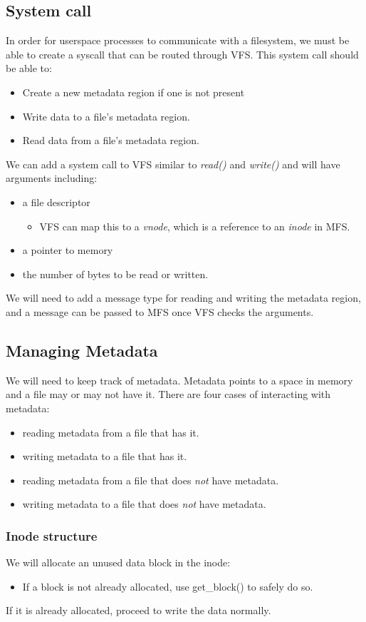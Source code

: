 \documentclass[paper=a4, fontsize=11pt]{scrartcl}
\numberwithin{equation}{section} %
\numberwithin{figure}{section} %
\numberwithin{table}{section} %
\begin{document}
	\subsection{System call}
	In order for userspace processes to communicate with a filesystem, we must be able to create a syscall that can be routed through VFS. This system call should be able to:
		\begin{itemize}
			\item Create a new metadata region if one is not present
			\item Write data to a file's metadata region.
			\item Read data from a file's metadata region. 
		\end{itemize}
	We can add a system call to VFS similar to {\it read()} and {\it write()} and will have arguments 		including:
		\begin{itemize}
			\item a file descriptor
			\begin{itemize}
				\item VFS can map this to a {\it vnode}, which is a reference to an {\it inode} in MFS.
			\end {itemize}
			\item a pointer to memory
			\item the number of bytes to be read or written.
		\end{itemize}
	We will need to add a message type for reading and writing the metadata region, and a message can be passed to MFS once VFS checks the arguments.


	\subsection{Managing Metadata}
	We will need to keep track of metadata. Metadata points to a space in memory and a file may or may not have it. There are four cases of interacting with metadata:
		\begin{itemize}
			\item reading metadata from a file that has it.
			\item writing metadata to a file that has it.
			\item reading metadata from a file that does {\it not} have metadata.
			\item writing metadata to a file that does {\it not} have metadata.
		\end{itemize}

		\subsubsection{Inode structure}
		We will allocate an unused data block in the inode:
			\begin{itemize}
				\item If a block is not already allocated, use get\_block() to safely do so.
			\end{itemize}
		If it is already allocated, proceed to write the data normally. \\
\end{document}
